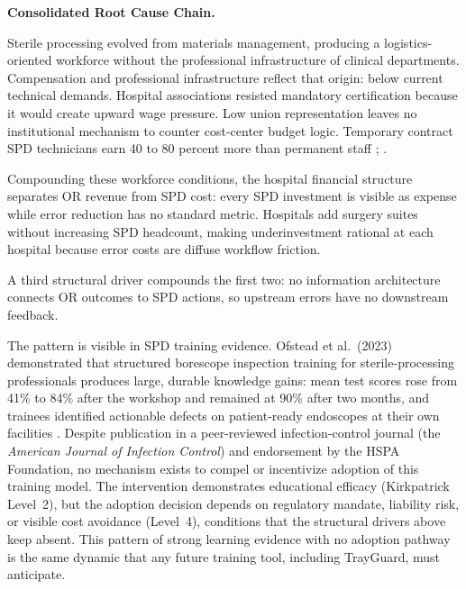 \documentclass[10pt,a4paper]{article}
\begin{document}
\textbf{Consolidated Root Cause Chain.}

Sterile processing evolved from materials management, producing a logistics-oriented workforce without the professional infrastructure of clinical departments.
Compensation and professional infrastructure reflect that origin: below current technical demands.
Hospital associations resisted mandatory certification because it would create upward wage pressure.
Low union representation leaves no institutional mechanism to counter cost-center budget logic.
Temporary contract SPD technicians earn 40 to 80 percent more than permanent staff \cite{nadeau-2023-spd-salary-survey}; \cite{specialtycare-travel-spd-2026}.

Compounding these workforce conditions, the hospital financial structure separates OR revenue from SPD cost: every SPD investment is visible as expense while error reduction has no standard metric.
Hospitals add surgery suites without increasing SPD headcount, making underinvestment rational at each hospital because error costs are diffuse workflow friction.

A third structural driver compounds the first two: no information architecture connects OR outcomes to SPD actions, so upstream errors have no downstream feedback.

The pattern is visible in SPD training evidence. Ofstead et al.\ (2023) demonstrated that structured
borescope inspection training for sterile-processing professionals
produces large, durable knowledge gains: mean test scores rose from
41\% to 84\% after the workshop and remained at 90\% after two months,
and trainees identified actionable defects on patient-ready endoscopes
at their own facilities
\cite{ofstead-et-al-2023}.
Despite publication in a peer-reviewed infection-control journal (the
\emph{American Journal of Infection Control}) and endorsement by the
HSPA Foundation, no mechanism exists to compel or incentivize adoption
of this training model. The intervention demonstrates educational
efficacy (Kirkpatrick Level~2), but the adoption decision depends on
regulatory mandate, liability risk, or visible cost avoidance (Level~4),
conditions that the structural drivers above keep absent. This
pattern of strong learning evidence with no adoption pathway is the
same dynamic that any future training tool, including TrayGuard, must
anticipate.
\end{document}
